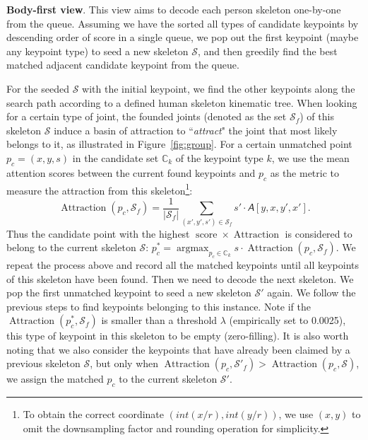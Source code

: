 \documentclass{article} \usepackage{iclr_conference,times}
\newcommand{\tens}[1]{\bm{\mathsfit{#1}}}
\def\tA{{\tens{A}}}
\def\sC{{\mathbb{C}}}
\begin{document}
\textbf{Body-first view}. This view aims to decode each person skeleton one-by-one from the queue. Assuming we have the sorted all types of candidate keypoints by descending order of score in a single queue, we pop out the first keypoint (maybe any keypoint type) to seed a new skeleton $\mathcal{S}$, and then greedily find the best matched adjacent candidate keypoint from the queue.


For the seeded $\mathcal{S}$ with the initial keypoint, we find the other keypoints along the search path according to a defined human skeleton kinematic tree. When looking for a certain type of joint, the founded joints (denoted as the set $\mathcal{S}_f$) of this skeleton $\mathcal{S}$ induce a basin of attraction to ``\textit{attract}" the joint that most likely belongs to it, as illustrated in Figure~\ref{fig:group}. For a certain unmatched point $p_{c}={(x,y,s)}$ in the candidate set $\sC_k$ of the keypoint type $k$, we use the mean attention scores between the current found keypoints and $p_c$ as the metric to measure the attraction from this skeleton\footnote{To obtain the correct coordinate $(int(x/r),int(y/r))$, we use $(x,y)$ to omit the downsampling factor and rounding operation for simplicity.}:
\begin{equation}
\operatorname{Attraction}(p_{c},\mathcal{S}_f)=\frac{1}{|\mathcal{S}_f|}\sum_{(x',y', s')\in \mathcal{S}_f}s'\cdot\tA[y,x,y',x'].
\end{equation}
Thus the candidate point with the highest $\operatorname{score} \times \operatorname{Attraction}$ is considered to belong to the current skeleton $\mathcal{S}$: 
$p_c^*= \operatorname{argmax}_{p_c\in \sC_k}s\cdot\operatorname{Attraction}(p_c,\mathcal{S}_f).$
We repeat the process above and record all the matched keypoints until all keypoints of this skeleton have been found.
Then we need to decode the next skeleton. 
We pop the first unmatched keypoint to seed a new skeleton $\mathcal{S}'$ again. 
We follow the previous steps to find keypoints belonging to this instance. 
Note if the $\operatorname{Attraction}(p_c^*, \mathcal{S}_f)$ is smaller than a threshold $\lambda$ (empirically set to 0.0025), this type of keypoint in this skeleton to be empty (zero-filling). 
It is also worth noting that we also consider the keypoints that have already been claimed by a previous skeleton $\mathcal{S}$, but only when $\operatorname{Attraction}(p_c,\mathcal{S}'_f)>\operatorname{Attraction}(p_c,\mathcal{S})$, we assign the matched $p_c$ to the current skeleton $\mathcal{S}'$.
\end{document}
